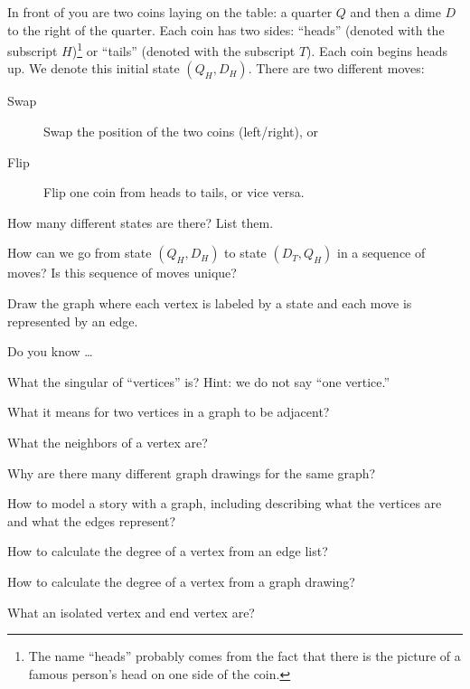 \begin{exer}[\exerU] %
\label{exer_quarter_dime}
    In front of you are two coins laying on the table: a quarter $Q$ and then a dime $D$ to the right of the quarter. Each coin has two sides: ``heads'' (denoted with the subscript $H$)\footnote{The name ``heads'' probably comes from the fact that there is the picture of a famous person's head on one side of the coin.} or ``tails'' (denoted with the subscript $T$).  Each coin begins heads up.  We denote this initial state $(Q_H,D_H)$.   There are two different moves:
    \begin{description}
        \item [\quad Swap] Swap the position of the two coins (left/right), or 
        \item [\quad Flip] Flip one coin from heads to tails, or vice versa.
    \end{description}
    \begin{exerpart}
        \item How many different states are there?  List them.
        \item How can we go from state $(Q_H,D_H)$ to state $(D_T,Q_H)$ in a sequence of moves? Is this sequence of moves unique?
        \item Draw the graph where each vertex is labeled by a state and each move is represented by an edge.    
    \end{exerpart}
\end{exer}

\begin{exer}[\exerR] %
\label{exer_dyk_defn_graph}
    Do you know \ldots
        \begin{exerpart}
            \item What the singular of ``vertices'' is? Hint: we do not say ``one vertice.''
            \item What it means for two vertices in a graph to be adjacent?
            \item What the neighbors of a vertex are?
            \item Why are there many different graph drawings for the same graph?
            \item How to model a story with a graph, including describing what the vertices are and what the edges represent?
            \item How to calculate the degree of a vertex from an edge list?
            \item How to calculate the degree of a vertex from a graph drawing?
            \item What an isolated vertex and end vertex are?
        \end{exerpart}
\end{exer}

